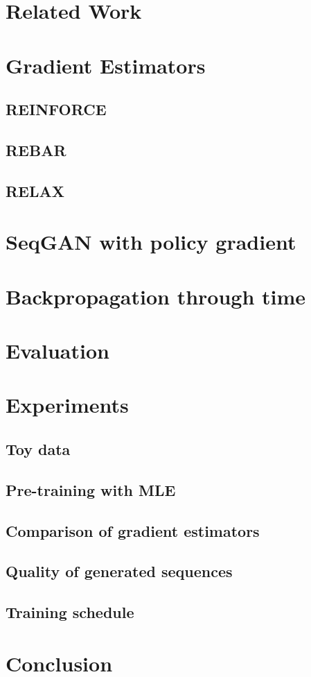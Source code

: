 \documentclass[11pt, english]{article}
\begin{document}
  \section{Related Work}
  
  \section{Gradient Estimators}
      
  \subsection{REINFORCE}
  
  \subsection{REBAR}
  
  \subsection{RELAX}
  
  \section{SeqGAN with policy gradient}
  
  \section{Backpropagation through time}
  
  \section{Evaluation}
  
  \section{Experiments}
  
  \subsection{Toy data}
  
  \subsection{Pre-training with MLE}
  
  \subsection{Comparison of gradient estimators}
  
  \subsection{Quality of generated sequences}
  
  \subsection{Training schedule}
  
  
  \section{Conclusion}
  

  
  
  
  
  
\end{document}
